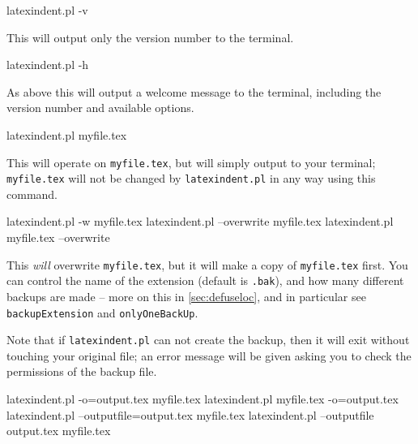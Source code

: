	\begin{commandshell}
latexindent.pl -v
\end{commandshell}
	This will output only the version number to the terminal.


	\begin{commandshell}
latexindent.pl -h
\end{commandshell}

	As above this will output a welcome message to the terminal, including the version number
	and available options.
	\begin{commandshell}
latexindent.pl myfile.tex
\end{commandshell}

	This will operate on \texttt{myfile.tex}, but will simply output to your terminal;
	\texttt{myfile.tex} will not be changed by \texttt{latexindent.pl} in any way using this
	command.

	\begin{commandshell}
latexindent.pl -w myfile.tex
latexindent.pl --overwrite myfile.tex
latexindent.pl myfile.tex --overwrite 
\end{commandshell}

	This \emph{will} overwrite \texttt{myfile.tex}, but it will make a copy of
	\texttt{myfile.tex} first. You can control the name of the extension (default is
	\texttt{.bak}), and how many different backups are made -- more on this in
	\cref{sec:defuseloc}, and in particular see \texttt{backupExtension} and
	\texttt{onlyOneBackUp}.

	Note that if \texttt{latexindent.pl} can not create the backup, then it will exit without
	touching your original file; an error message will be given asking you to check the
	permissions of the backup file.

	\begin{commandshell} 
latexindent.pl -o=output.tex myfile.tex
latexindent.pl myfile.tex -o=output.tex 
latexindent.pl --outputfile=output.tex myfile.tex
latexindent.pl --outputfile output.tex myfile.tex
\end{commandshell}

